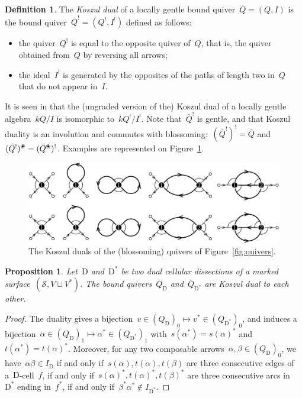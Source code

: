 \documentclass{amsart}
\newtheorem{proposition}[theorem]{Proposition}
\theoremstyle{definition}
\newtheorem{definition}[theorem]{Definition}
\newcommand{\fref}[1]{Figure~\ref{#1}} %
\newcommand{\darkblue}{\color{darkblue}} %
\newcommand{\defn}[1]{\textsl{\darkblue #1}} %
\newcommand{\blossom}{^\text{\ding{96}}} %
\newcommand{\surface}{\mathcal{S}} %
\newcommand{\dual}{^*} %
\newcommand{\dissection}{\mathrm{D}} %
\newcommand{\koszul}{^!} %
\begin{document}
\begin{definition}
\label{defi:koszulDual}
The \defn{Koszul dual} of a locally gentle bound quiver~$\bar Q = (Q,I)$ is the bound quiver~$\bar Q\koszul = (Q\koszul, I\koszul)$ defined as follows:
\begin{itemize}
 \item the quiver~$Q\koszul$ is equal to the opposite quiver of~$Q$, that is, the quiver obtained from~$Q$ by reversing all arrows;
 \item the ideal~$I\koszul$ is generated by the opposites of the paths of length two in~$Q$ that do not appear in~$I$.
\end{itemize}
\end{definition}
It is seen in \cite{BessenrodtHolm} that the (ungraded version of the) Koszul dual of a locally gentle algebra~$kQ/I$ is isomorphic to~$kQ\koszul/I\koszul$.
Note that~$\bar Q\koszul$ is gentle, and that Koszul duality is an involution and commutes with blossoming:~$(\bar Q\koszul)\koszul = \bar Q$ and~$(\bar Q\koszul)\blossom = (\bar Q\blossom)\koszul$.
Examples are represented on \fref{fig:koszulQuivers}.

\begin{figure}[t]
	\capstart
	\centerline{\includegraphics[scale=.6]{koszulQuivers}}
	\caption{The Koszul duals of the (blossoming) quivers of \fref{fig:quivers}.}
	\label{fig:koszulQuivers}
\end{figure}

\begin{proposition}
\label{prop:dualityKoszul1}
Let~$\dissection$ and~$\dissection\dual$ be two dual cellular dissections of a marked surface~$(\surface, V\sqcup V\dual)$.
The bound quivers~$\bar Q_{\dissection}$ and~$\bar Q_{\dissection\dual}$ are Koszul dual to each other.
\end{proposition}

\begin{proof}
 The duality gives a bijection~$v\in (Q_\dissection)_0\mapsto v\dual\in (Q_{\dissection\dual})_0$, and induces a bijection~$\alpha\in (Q_\dissection)_1\mapsto \alpha\dual\in (Q_{\dissection\dual})_1$ with~$s(\alpha\dual)=s(\alpha)\dual$ and~$t(\alpha\dual)=t(\alpha)\dual$.
 Moreover, for any two composable arrows~$\alpha,\beta\in(Q_\dissection)_0$, we have~$\alpha\beta\in I_\dissection$ if and only if~$s(\alpha),t(\alpha),t(\beta)$ are three consecutive edges of a~$\dissection$-cell~$f$, if and only if~$s(\alpha)\dual,t(\alpha)\dual,t(\beta)\dual$ are three consecutive arcs in~$\dissection\dual$ ending in~$f\dual$, if and only if~$\beta\dual\alpha\dual\notin I_{\dissection\dual}$.
\end{proof}
\end{document}

